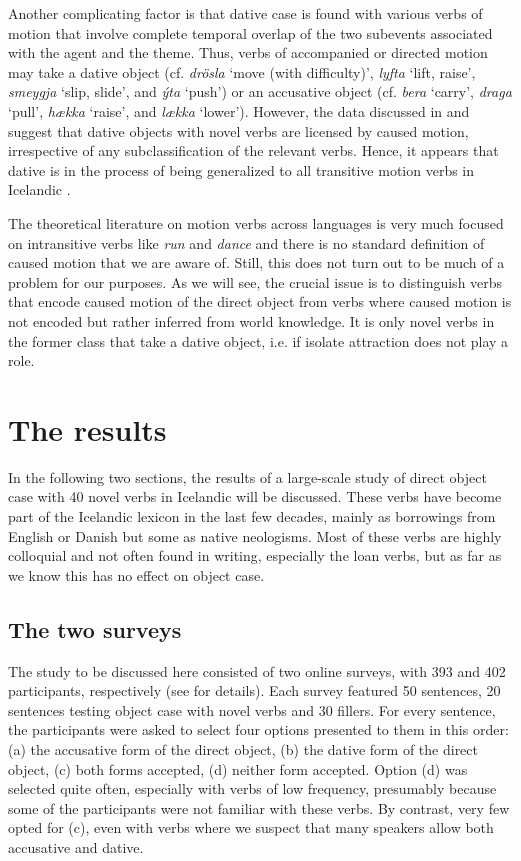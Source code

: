 \documentclass[output=paper,modfonts,nonflat,colorlinks,citecolor=brown]{langsci/langscibook}
\begin{document}
Another complicating factor is that dative case is found with various verbs of motion that involve complete temporal overlap of the two subevents associated with the agent and the theme. Thus, verbs of accompanied or directed motion may take a dative object (cf. \textit{drösla} ‘move (with difficulty)’, \textit{lyfta} ‘lift, raise’, \textit{smeygja} ‘slip, slide’, and \textit{ýta} ‘push’) or an accusative object (cf. \textit{bera} ‘carry’, \textit{draga} ‘pull’, \textit{hækka} ‘raise’, and \textit{lækka} ‘lower’). However, the data discussed in  and  suggest that dative objects with novel verbs are licensed by caused motion, irrespective of any subclassification of the relevant verbs. Hence, it appears that dative is in the process of being generalized to all transitive motion verbs in Icelandic \citep{Barðdal2008}.

The theoretical literature on motion verbs across languages is very much focused on intransitive verbs like \textit{run} and \textit{dance} and there is no standard definition of caused motion that we are aware of. Still, this does not turn out to be much of a problem for our purposes. As we will see, the crucial issue is to distinguish verbs that encode caused motion of the direct object from verbs where caused motion is not encoded but rather inferred from world knowledge. It is only novel verbs in the former class that take a dative object, i.e. if isolate attraction does not play a role.

\section{The results} %
\label{sec:jonsson:3}

In the following two sections, the results of a large-scale study of direct object case with 40 novel verbs in Icelandic will be discussed. These verbs have become part of the Icelandic lexicon in the last few decades, mainly as borrowings from English or Danish but some as native neologisms. Most of these verbs are highly colloquial and not often found in writing, especially the loan verbs, but as far as we know this has no effect on object case.

\subsection{The two surveys} %
\label{sec:jonsson:3.1}

The study to be discussed here consisted of two online surveys, with 393 and 402 participants, respectively (see \citealt{Thórarinsdóttir2015} for details). Each survey featured 50 sentences, 20 sentences testing object case with novel verbs and 30 fillers. For every sentence, the participants were asked to select four options presented to them in this order: (a) the accusative form of the direct object, (b) the dative form of the direct object, (c) both forms accepted, (d) neither form accepted. Option (d) was selected quite often, especially with verbs of low frequency, presumably because some of the participants were not familiar with these verbs. By contrast, very few opted for (c), even with verbs where we suspect that many speakers allow both accusative and dative.
\end{document}

